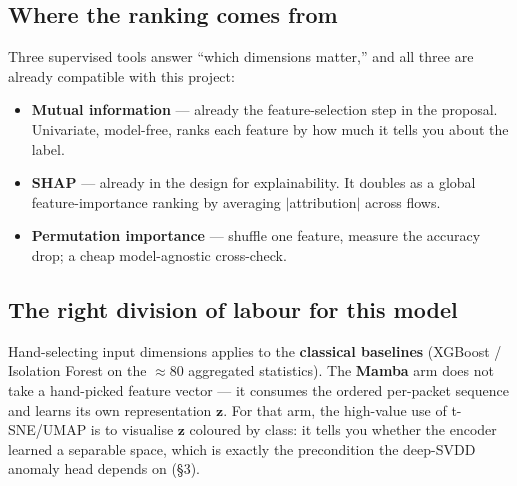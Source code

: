 \documentclass[11pt,a4paper]{article}
\begin{document}
\subsection{Where the ranking comes from}
Three supervised tools answer ``which dimensions matter,'' and all three are already compatible with this project:
\begin{itemize}[leftmargin=*, itemsep=2pt]
  \item \textbf{Mutual information} --- already the feature-selection step in the proposal. Univariate, model-free, ranks each feature by how much it tells you about the label.
  \item \textbf{SHAP} --- already in the design for explainability. It doubles as a global feature-importance ranking by averaging $|$attribution$|$ across flows.
  \item \textbf{Permutation importance} --- shuffle one feature, measure the accuracy drop; a cheap model-agnostic cross-check.
\end{itemize}

\subsection{The right division of labour for this model}
Hand-selecting input dimensions applies to the \textbf{classical baselines} (XGBoost / Isolation Forest on the $\approx$80 aggregated statistics). The \textbf{Mamba} arm does not take a hand-picked feature vector --- it consumes the ordered per-packet sequence and learns its own representation $\mathbf{z}$. For that arm, the high-value use of t-SNE/UMAP is to visualise $\mathbf{z}$ coloured by class: it tells you whether the encoder learned a separable space, which is exactly the precondition the deep-SVDD anomaly head depends on (\S3).
\end{document}

